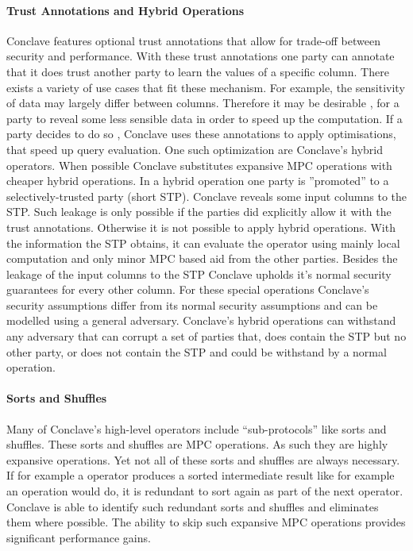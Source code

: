 \paragraph{Trust Annotations and Hybrid Operations}
Conclave features optional trust annotations that allow for trade-off between security and performance. With these trust annotations one party can annotate that it does trust another party to learn the values of a specific column. There exists a variety of use cases that fit these mechanism. For example, the sensitivity of data may largely differ between columns. Therefore it may be desirable , for a party to reveal some less sensible data in order to speed up the computation. If a party decides to do so , Conclave uses these annotations to apply optimisations, that speed up query evaluation. One such optimization are Conclave's hybrid operators. When possible Conclave substitutes expansive MPC operations with cheaper hybrid operations. In a hybrid operation one party is ''promoted'' to a selectively-trusted party (short STP). Conclave reveals some input columns to the STP. Such leakage is only possible if the parties did explicitly allow it with the trust annotations. Otherwise it is not possible to apply hybrid operations. With the information the STP obtains, it can evaluate the operator using mainly local computation and only minor MPC based aid from the other parties. Besides the leakage of the input columns to the STP Conclave upholds it's normal security guarantees for every other column. For these special operations Conclave's security assumptions differ from its normal security assumptions and can be modelled using a general adversary. Conclave's hybrid operations can withstand any adversary that can corrupt a set of parties that, does contain the STP but no other party, or does not contain the STP and could be withstand by a normal operation. 
\paragraph{Sorts and Shuffles}
Many of Conclave's high-level operators include ``sub-protocols'' like sorts and shuffles. These sorts and shuffles are MPC operations. As such they are highly expansive operations. Yet not all of these sorts and shuffles are always necessary. If for example a operator produces a sorted intermediate result like for example an  operation would do, it is redundant to sort again as part of the next operator. Conclave is able to identify such redundant sorts and shuffles and eliminates them where possible. The ability to skip such expansive MPC operations provides significant performance gains.



